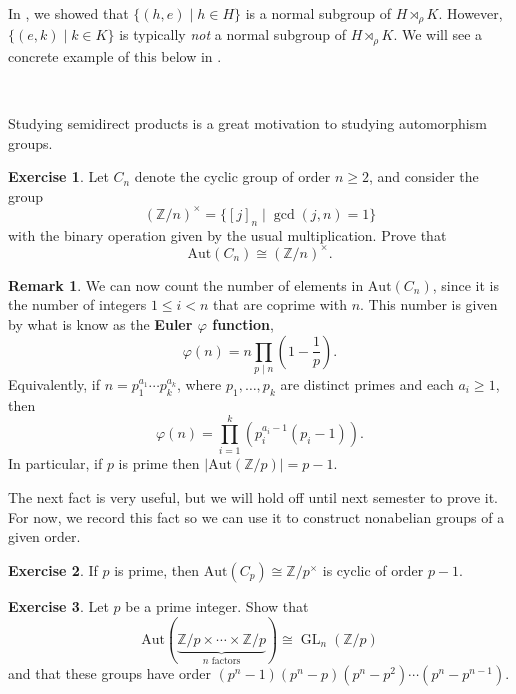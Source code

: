 \documentclass[12pt]{report}
\numberwithin{equation}{section}
\numberwithin{theorem}{chapter}
\theoremstyle{definition}
\newtheorem{exercise}{Exercise}
\newtheorem*{basic properties}{Basic Properties}
\newtheorem*{Important Remark}{Important Remark}
\newtheorem{remark}[theorem]{Remark}
\newcommand{\df}[1]{{\bf #1}\index{#1}}
\DeclareMathOperator{\GL}{GL}
\def\sdp{\rtimes}
\begin{document}
\vspace{0.5em}

In , we showed that $\{(h,e)\mid h \in H\}$ is a normal subgroup of $H \sdp_\rho K$.
However, $\{(e,k)\mid k\in K\}$ is typically {\em not} a normal subgroup of $H \sdp_\rho K$. We will see a concrete example of this below in .

\




Studying semidirect products is a great motivation to studying automorphism groups.


\begin{exercise}\label{aut Cn}
Let $C_n$ denote the cyclic group of order $n \geqslant 2$, and consider the group
$$(\mathbb{Z}/n)^\times = \{ [j]_n \mid \gcd(j,n)=1\}$$
with the binary operation given by the usual multiplication. Prove that 
$$\mathrm{Aut}(C_n) \cong (\mathbb{Z}/n)^\times.$$
\end{exercise}



\begin{remark}
We can now count the number of elements in $\mathrm{Aut}(C_n)$, since it is the number of integers $1 \leqslant i <n$ that are coprime with $n$. This number is given by what is know as the \df{Euler $\varphi$ function}, 
$$\varphi(n) = n \prod_{p \mid n} \left( 1 - \frac{1}{p} \right).$$
Equivalently, if $n = p_1^{a_1} \cdots p_k^{a_k}$, where $p_1, \ldots, p_k$ are distinct primes and each $a_i \geqslant 1$, then
$$\varphi(n) = \prod_{i=1}^k \left( p_i^{a_i-1} (p_i - 1) \right).$$
In particular, if $p$ is prime then $| \mathrm{Aut}(\mathbb{Z}/p) | = p-1$.
\end{remark}


The next fact is very useful, but we will hold off until next semester to prove it. For now, we record this fact so we can use it to construct nonabelian groups of a given order.


\begin{exercise}\label{aut Cp cyclic of order p-1}
If $p$ is prime, then $\mathrm{Aut}(C_p) \cong \mathbb{Z}/p^\times$ is cyclic of order $p-1$. 
\end{exercise}

\begin{exercise}
Let $p$ be a prime integer. Show that
$$\mathrm{Aut}(\underbrace{\mathbb{Z}/p\times \cdots\times\mathbb{Z}/p}_{n \text{ factors}})\cong \GL_n(\mathbb{Z}/p)$$ 
and that these groups have order $(p^n-1)(p^n-p)(p^n-p^2)\cdots(p^n-p^{n-1})$.
\end{exercise}
\end{document}
